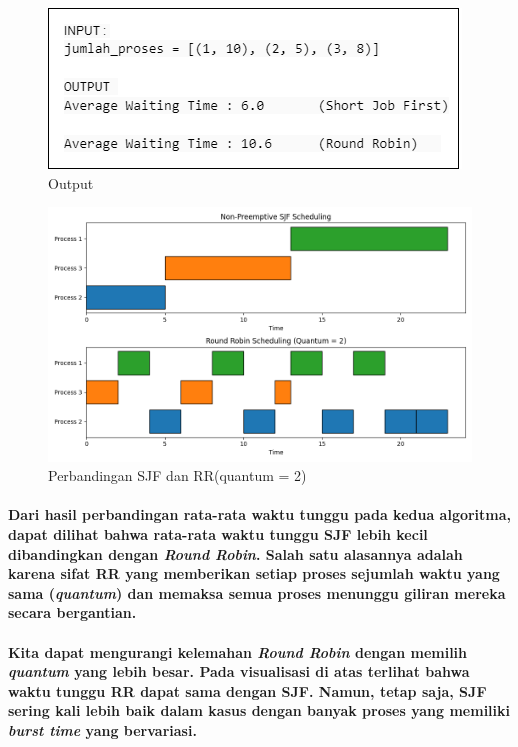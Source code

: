 \documentclass[12pt]{article}
\begin{document}
\begin{figure}[H]
    \centering
    \includegraphics[width=1\linewidth]{asset/41.png}
    \caption{Output}
\end{figure}

\begin{figure}[H]
    \centering
    \includegraphics[width=1\linewidth]{asset/411.png}
    \caption{Perbandingan SJF dan RR(quantum = 2)}
\end{figure}

\paragraph{
    \hspace*{1cm} Dari hasil perbandingan rata-rata waktu tunggu pada kedua algoritma, dapat dilihat bahwa rata-rata waktu tunggu SJF lebih kecil dibandingkan dengan \textit{Round Robin}. Salah satu alasannya adalah karena sifat RR yang memberikan setiap proses sejumlah waktu yang sama (\textit{quantum}) dan memaksa semua proses menunggu giliran mereka secara bergantian. 
}

\paragraph{
    \hspace*{1cm} Kita dapat mengurangi kelemahan \textit{Round Robin} dengan memilih \textit{quantum} yang lebih besar. Pada visualisasi di atas terlihat bahwa waktu tunggu RR dapat sama dengan SJF. Namun, tetap saja, SJF sering kali lebih baik dalam kasus dengan banyak proses yang memiliki \textit{burst time} yang bervariasi.
}
\end{document}
